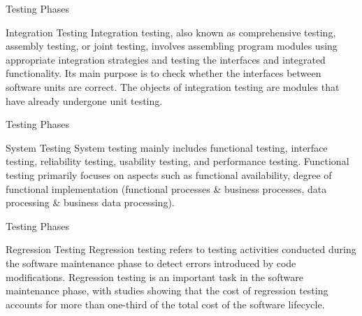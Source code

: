 \documentclass{beamer}
\begin{document}
\begin{frame}[t]{Testing Phases}
    \begin{block}{Integration Testing}
Integration testing, also known as comprehensive testing, assembly testing, or joint testing, involves assembling program modules using appropriate integration strategies and testing the interfaces and integrated functionality. Its main purpose is to check whether the interfaces between software units are correct. The objects of integration testing are modules that have already undergone unit testing.
    \end{block}
\end{frame}

\begin{frame}[t]{Testing Phases}
    \begin{block}{System Testing}
System testing mainly includes functional testing, interface testing, reliability testing, usability testing, and performance testing. Functional testing primarily focuses on aspects such as functional availability, degree of functional implementation (functional processes \& business processes, data processing \& business data processing).
    \end{block}
\end{frame}

\begin{frame}[t]{Testing Phases}
    \begin{block}{Regression Testing}
Regression testing refers to testing activities conducted during the software maintenance phase to detect errors introduced by code modifications. Regression testing is an important task in the software maintenance phase, with studies showing that the cost of regression testing accounts for more than one-third of the total cost of the software lifecycle.

\end{block}
\end{frame}
\end{document}
